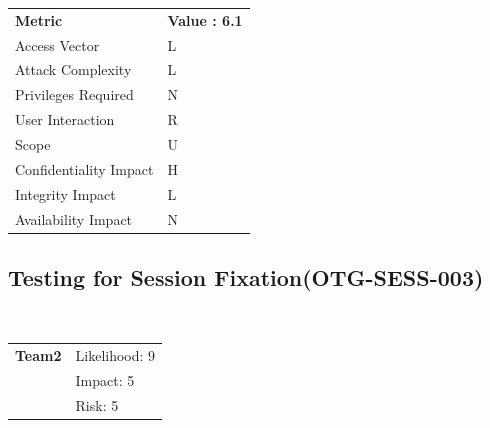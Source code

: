 \documentclass[headsepline,footsepline,footinclude=false,oneside,fontsize=11pt,paper=a4,listof=totoc,bibliography=totoc]{scrbook} %
\begin{document}
\begin{center}
	\begin{tabular}{ll}
		\rowcolor[HTML]{34CDF9}
		{\color[HTML]{ECF4FF} \textbf{Metric}}        & {\color[HTML]{ECF4FF} \textbf{Value : 6.1}} \\
		\rowcolor[HTML]{BBDAFF}
		{\color[HTML]{333333} Access Vector}          & {\color[HTML]{333333} } L             \\
		\rowcolor[HTML]{ECF4FF}
		{\color[HTML]{333333} Attack Complexity}      & {\color[HTML]{333333} } L              \\
		\rowcolor[HTML]{BBDAFF}
		{\color[HTML]{333333} Privileges Required}    & {\color[HTML]{333333} } N              \\
		\rowcolor[HTML]{ECF4FF}
		{\color[HTML]{333333} User Interaction}       & {\color[HTML]{333333} } R              \\
		\rowcolor[HTML]{BBDAFF}
		{\color[HTML]{333333} Scope}                  & {\color[HTML]{333333} } U              \\
		\rowcolor[HTML]{ECF4FF}
		{\color[HTML]{333333} Confidentiality Impact} & {\color[HTML]{333333} } H              \\
		\rowcolor[HTML]{BBDAFF}
		{\color[HTML]{333333} Integrity Impact}       & {\color[HTML]{333333} } L              \\
		\rowcolor[HTML]{ECF4FF}
		{\color[HTML]{333333} Availability Impact}    & {\color[HTML]{333333} } N
	\end{tabular}
\end{center}

\pagebreak
\subsection{Testing for Session Fixation(OTG-SESS-003)}\

\begin{tabular}{cR{12cm}}
	\textbf{Team2} & Likelihood: 9\\& Impact: 5\\& Risk: 5
\end{tabular}
\end{document}
